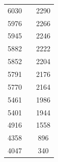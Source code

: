 \documentclass[a4paper,12pt]{article} %
\begin{document}
\begin{table}[H]
\begin{tabular}{|c|c|c|}
				6030           &                       & 2290          \\ \cline{1-1} \cline{3-3} 
				5976           &                       & 2266          \\ \cline{1-1} \cline{3-3} 
				5945           &                       & 2246          \\ \cline{1-1} \cline{3-3} 
				5882           &                       & 2222          \\ \cline{1-1} \cline{3-3} 
				5852           &                       & 2204          \\ \cline{1-1} \cline{3-3} 
				5791           &                       & 2176          \\ \cline{1-1} \cline{3-3} 
				5770           &                       & 2164          \\ \cline{1-1} \cline{3-3} 
				5461           &                       & 1986          \\ \cline{1-1} \cline{3-3} 
				5401           &                       & 1944          \\ \cline{1-1} \cline{3-3} 
				4916           &                       & 1558          \\ \cline{1-1} \cline{3-3} 
				4358           &                       & 896           \\ \cline{1-1} \cline{3-3} 
				4047           &                       & 340           \\ \hline
			\end{tabular}
		\end{table}
	
	\newpage
\end{document}
